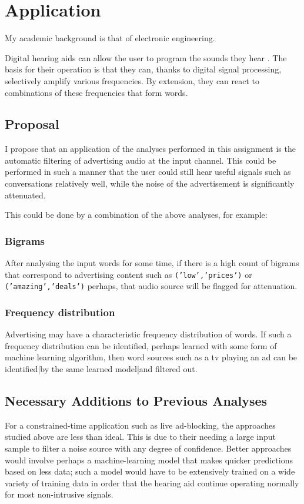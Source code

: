 \section{Application}

\begin{strip}
My academic background is that of electronic engineering.

Digital hearing aids can allow the user to program the sounds they hear \cite{dhasa}. The basis for their operation is that they can, thanks to digital signal processing, selectively amplify various frequencies. By extension, they can react to combinations of these frequencies that form words.

\subsection{Proposal}
I propose that an application of the analyses performed in this assignment is the automatic filtering of advertising audio at the input channel. This could be performed in such a manner that the user could still hear useful signals such as conversations relatively well, while the noise of the advertisement is significantly attenuated.

This could be done by a combination of the above analyses, for example:
\subsubsection{Bigrams}
After analysing the input words for some time, if there is a high count of bigrams that correspond to advertising content such as \texttt{('low','prices')} or \texttt{('amazing','deals')} perhaps, that audio source will be flagged for attenuation.
\subsubsection{Frequency distribution}
Advertising may have a characteristic frequency distribution of words. If such a frequency distribution can be identified, perhaps learned with some form of machine learning algorithm, then word sources such as a tv playing an ad can be identified|by the same learned model|and filtered out.

\subsection{Necessary Additions to Previous Analyses}
For a constrained-time application such as live ad-blocking, the approaches studied above are less than ideal. This is due to their needing a large input sample to filter a noise source with any degree of confidence. Better approaches would involve perhaps a machine-learning model that makes quicker predictions based on less data; such a model would have to be extensively trained on a wide variety of training data in order that the hearing aid continue operating normally for most non-intrusive signals.

\end{strip}